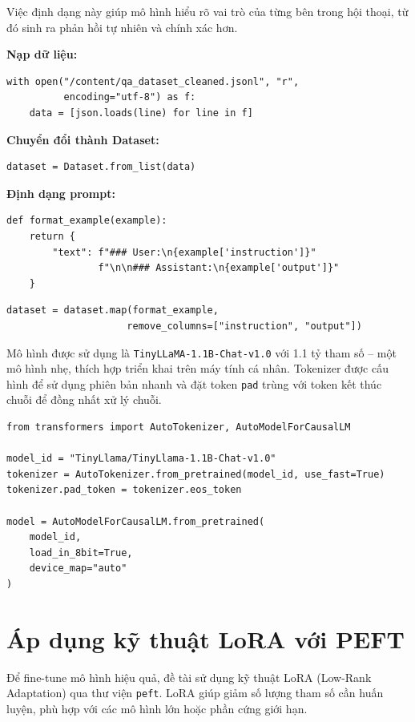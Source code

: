 \documentclass[../DoAn.tex]{subfiles}
\begin{document}
Việc định dạng này giúp mô hình hiểu rõ vai trò của từng bên trong hội thoại, từ đó sinh ra phản hồi tự nhiên và chính xác hơn.

\textbf{Nạp dữ liệu:}
\begin{verbatim}
with open("/content/qa_dataset_cleaned.jsonl", "r", 
          encoding="utf-8") as f:
    data = [json.loads(line) for line in f]
\end{verbatim}

\textbf{Chuyển đổi thành Dataset:}
\begin{verbatim}
dataset = Dataset.from_list(data)
\end{verbatim}

\textbf{Định dạng prompt:}
\begin{verbatim}
def format_example(example):
    return {
        "text": f"### User:\n{example['instruction']}"
                f"\n\n### Assistant:\n{example['output']}"
    }
\end{verbatim}

\begin{verbatim}
dataset = dataset.map(format_example, 
                     remove_columns=["instruction", "output"])
\end{verbatim}

Mô hình được sử dụng là \texttt{TinyLLaMA-1.1B-Chat-v1.0} với 1.1 tỷ tham số – một mô hình nhẹ, thích hợp triển khai trên máy tính cá nhân. Tokenizer được cấu hình để sử dụng phiên bản nhanh và đặt token \texttt{pad} trùng với token kết thúc chuỗi để đồng nhất xử lý chuỗi.

\begin{lstlisting}
from transformers import AutoTokenizer, AutoModelForCausalLM

model_id = "TinyLlama/TinyLlama-1.1B-Chat-v1.0"
tokenizer = AutoTokenizer.from_pretrained(model_id, use_fast=True)
tokenizer.pad_token = tokenizer.eos_token

model = AutoModelForCausalLM.from_pretrained(
    model_id,
    load_in_8bit=True,
    device_map="auto"
)
\end{lstlisting}

\section{Áp dụng kỹ thuật LoRA với PEFT}

Để fine-tune mô hình hiệu quả, đề tài sử dụng kỹ thuật LoRA (Low-Rank Adaptation) qua thư viện \texttt{peft}. LoRA giúp giảm số lượng tham số cần huấn luyện, phù hợp với các mô hình lớn hoặc phần cứng giới hạn.
\end{document}

